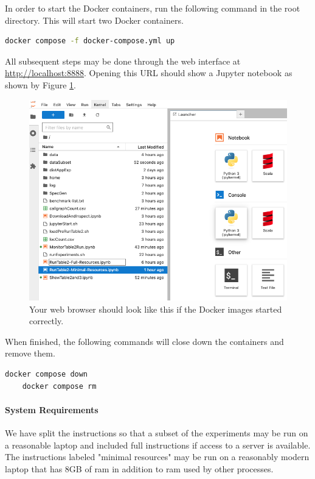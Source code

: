 \documentclass{acmart} %
\begin{document}
In order to start the Docker containers, run the following command in the root directory.  This will start two Docker containers.

\begin{lstlisting}[language=bash]
 docker compose -f docker-compose.yml up
\end{lstlisting}

All subsequent steps may be done through the web interface at \url{http://localhost:8888}.  Opening this URL should show a Jupyter notebook as shown by Figure \ref{fig:jupyter}.  


\begin{figure}[H]
    \includegraphics*[scale=0.35]{jupyter.png}
    \caption{Your web browser should look like this if the Docker images started correctly.}
    \label{fig:jupyter}
\end{figure}

When finished, the following commands will close down the containers and remove them.

\begin{lstlisting}[language=bash]
    docker compose down
    docker compose rm
\end{lstlisting}

\paragraph{System Requirements} 
We have split the instructions so that a subset of the experiments may be run on a reasonable laptop and included full instructions if access to a server is available.
The instructions labeled "minimal resources" may be run on a reasonably modern laptop that has 8GB of ram in addition to ram used by other processes. 
\end{document}
